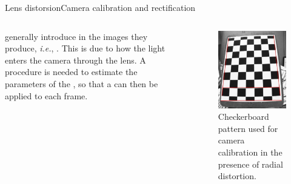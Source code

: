 \begin{frame}{Lens distorsion}{Camera calibration and rectification}
	\begin{columns}
		 generally introduce  in the images they produce, \emph{i.e.}, . This is due to how the light enters the camera through the lens.
		\newline\newline
		A  procedure is needed to estimate the parameters of the , so that a  can then be applied to each frame.

		\begin{figure}
			\centering
			\includegraphics[width=.6\textwidth]{radial}
			\caption{Checkerboard pattern used for camera calibration in the presence of radial distortion.}
			\label{fig:radial}
		\end{figure}
	\end{columns}
\end{frame}
